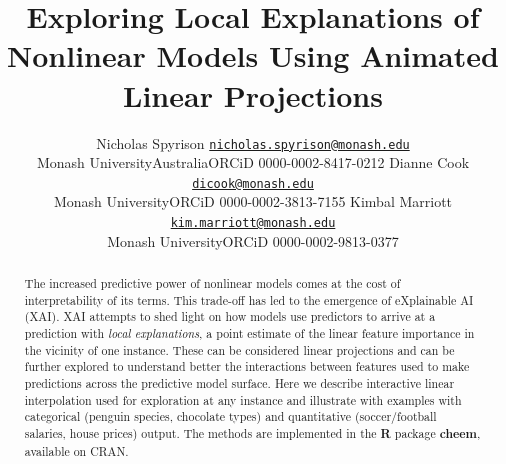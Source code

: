 \documentclass[11pt,twoside]{article}
\begin{document}
\def\proof{\par\noindent{\bf Proof\ }}
\def\endproof{\hfill\BlackBox\\[2mm]}

\title{Exploring Local Explanations of Nonlinear Models Using Animated Linear Projections}

\author{%
\name Nicholas Spyrison \email \href{mailto:nicholas.spyrison@monash.edu}{\nolinkurl{nicholas.spyrison@monash.edu}} \\\addr Monash University\newline Australia\newline ORCiD 0000-0002-8417-0212 \AND
%
\name Dianne Cook \email \href{mailto:dicook@monash.edu}{\nolinkurl{dicook@monash.edu}} \\\addr Monash University\newline ORCiD 0000-0002-3813-7155 \AND
%
\name Kimbal Marriott \email \href{mailto:kim.marriott@monash.edu}{\nolinkurl{kim.marriott@monash.edu}} \\\addr Monash University\newline ORCiD 0000-0002-9813-0377 \AND
}

\editor{}

\maketitle



\begin{abstract}
The increased predictive power of nonlinear models comes at the cost of interpretability of its terms. This trade-off has led to the emergence of eXplainable AI (XAI). XAI attempts to shed light on how models use predictors to arrive at a prediction with \emph{local explanations}, a point estimate of the linear feature importance in the vicinity of one instance. These can be considered linear projections and can be further explored to understand better the interactions between features used to make predictions across the predictive model surface. Here we describe interactive linear interpolation used for exploration at any instance and illustrate with examples with categorical (penguin species, chocolate types) and quantitative (soccer/football salaries, house prices) output. The methods are implemented in the \textbf{R} package \textbf{cheem}, available on CRAN.
\end{abstract}
\end{document}
